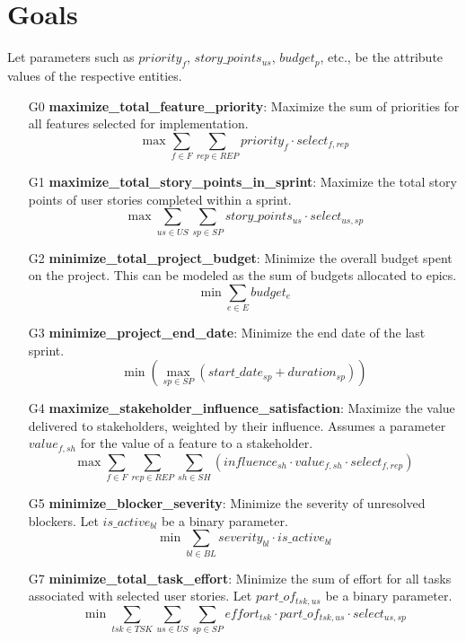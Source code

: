 \documentclass[11pt]{article}
\begin{document}
\section{Goals}
\label{sec:goals}
Let parameters such as $priority_f$, $story\_points_{us}$, $budget_p$, etc., be the attribute values of the respective entities.
\begin{itemize}
    \item[G0] \textbf{maximize\_total\_feature\_priority}: Maximize the sum of priorities for all features selected for implementation.
    $$ \max \sum_{f \in F} \sum_{rep \in REP} priority_f \cdot select_{f,rep} $$
    \item[G1] \textbf{maximize\_total\_story\_points\_in\_sprint}: Maximize the total story points of user stories completed within a sprint.
    $$ \max \sum_{us \in US} \sum_{sp \in SP} story\_points_{us} \cdot select_{us,sp} $$
    \item[G2] \textbf{minimize\_total\_project\_budget}: Minimize the overall budget spent on the project. This can be modeled as the sum of budgets allocated to epics.
    $$ \min \sum_{e \in E} budget_{e} $$
    \item[G3] \textbf{minimize\_project\_end\_date}: Minimize the end date of the last sprint.
    $$ \min \left( \max_{sp \in SP} (start\_date_{sp} + duration_{sp}) \right) $$
    \item[G4] \textbf{maximize\_stakeholder\_influence\_satisfaction}: Maximize the value delivered to stakeholders, weighted by their influence. Assumes a parameter $value_{f,sh}$ for the value of a feature to a stakeholder.
    $$ \max \sum_{f \in F} \sum_{rep \in REP} \sum_{sh \in SH} (influence_{sh} \cdot value_{f,sh} \cdot select_{f,rep}) $$
    \item[G5] \textbf{minimize\_blocker\_severity}: Minimize the severity of unresolved blockers. Let $is\_active_{bl}$ be a binary parameter.
    $$ \min \sum_{bl \in BL} severity_{bl} \cdot is\_active_{bl} $$
    \item[G7] \textbf{minimize\_total\_task\_effort}: Minimize the sum of effort for all tasks associated with selected user stories. Let $part\_of_{tsk,us}$ be a binary parameter.
    $$ \min \sum_{tsk \in TSK} \sum_{us \in US} \sum_{sp \in SP} effort_{tsk} \cdot part\_of_{tsk,us} \cdot select_{us,sp} $$
\end{itemize}
\end{document}
